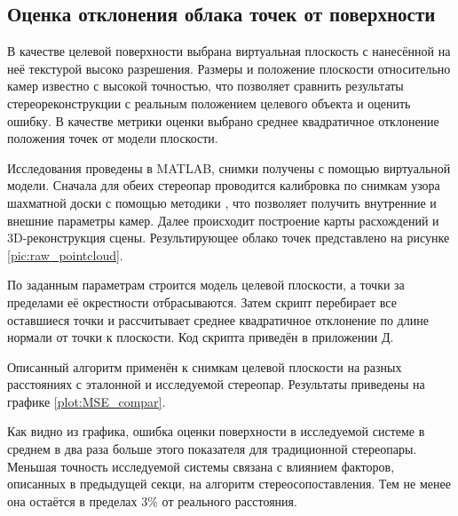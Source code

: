 
\subsection{Оценка отклонения облака точек от поверхности}  %

В качестве целевой поверхности выбрана виртуальная плоскость с нанесённой на неё текстурой высоко разрешения. Размеры и
положение плоскости относительно камер известно с высокой точностью, что позволяет сравнить результаты стереореконструкции
с реальным положением целевого объекта и оценить ошибку. В качестве метрики оценки выбрано среднее квадратичное отклонение
положения точек от модели плоскости. 

Исследования проведены в MATLAB, снимки получены с помощью виртуальной модели. Сначала для обеих стереопар проводится
калибровка по снимкам узора шахматной доски с помощью методики \cite{stereo_calib}, что позволяет получить 
внутренние и внешние параметры камер. %
Далее происходит построение карты расхождений \cite{SGBM} и 3D-реконструкция сцены. Результирующее облако точек 
представлено на рисунке
\ref{pic:raw_pointcloud}.

По заданным параметрам строится модель целевой плоскости, а точки за пределами её окрестности отбрасываются. %
Затем скрипт перебирает все оставшиеся точки и рассчитывает среднее квадратичное отклонение по длине нормали от 
точки к плоскости. Код скрипта приведён в приложении \hyperlink{app:matlab}{Д}.

Описанный алгоритм применён к снимкам целевой плоскости на разных расстояниях с эталонной и исследуемой стереопар.
Результаты приведены на графике \ref{plot:MSE_compar}.


Как видно из графика, ошибка оценки поверхности в исследуемой системе в среднем в два раза больше этого показателя для
традиционной стереопары. Меньшая точность исследуемой системы связана с влиянием факторов, описанных в предыдущей секци,
на алгоритм стереосопоставления.  Тем не менее она остаётся в пределах $3\%$ от реального расстояния.  %


%